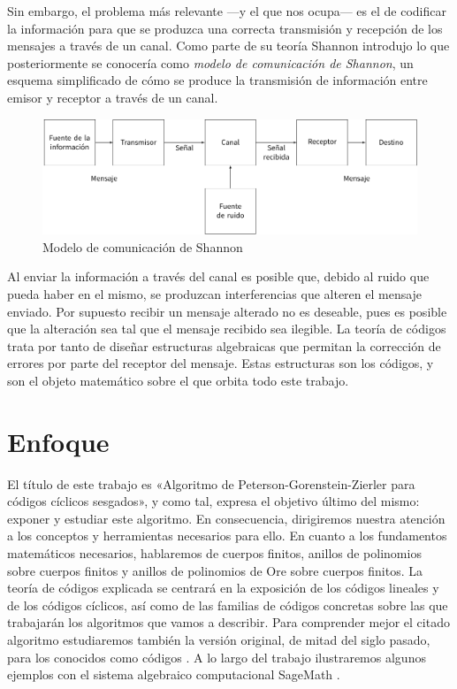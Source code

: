 Sin embargo, el problema más relevante —y el que nos ocupa— es el de codificar la información para que se produzca una correcta transmisión y recepción de los mensajes a través de un canal.
Como parte de su teoría Shannon introdujo lo que posteriormente se conocería como \emph{modelo de comunicación de Shannon}, un esquema simplificado de cómo se produce la transmisión de información entre emisor y receptor a través de un canal.
\begin{figure}
  \includegraphics[width=\textwidth]{assets/shannon-communication-model.pdf}
  \caption*{Modelo de comunicación de Shannon}
\end{figure}
Al enviar la información a través del canal es posible que, debido al ruido que pueda haber en el mismo, se produzcan interferencias que alteren el mensaje enviado.
Por supuesto recibir un mensaje alterado no es deseable, pues es posible que la alteración sea tal que el mensaje recibido sea ilegible.
La teoría de códigos trata por tanto de diseñar estructuras algebraicas que permitan la corrección de errores por parte del receptor del mensaje.
Estas estructuras son los códigos, y son el objeto matemático sobre el que orbita todo este trabajo.

\section*{Enfoque}

El título de este trabajo es «Algoritmo de Peterson-Gorenstein-Zierler para códigos cíclicos sesgados», y como tal, expresa el objetivo último del mismo: exponer y estudiar este algoritmo.
En consecuencia, dirigiremos nuestra atención a los conceptos y herramientas necesarios para ello.
En cuanto a los fundamentos matemáticos necesarios, hablaremos de cuerpos finitos, anillos de polinomios sobre cuerpos finitos y anillos de polinomios de Ore sobre cuerpos finitos.
La teoría de códigos explicada se centrará en la exposición de los códigos lineales y de los códigos cíclicos, así como de las familias de códigos concretas sobre las que trabajarán los algoritmos que vamos a describir.
Para comprender mejor el citado algoritmo estudiaremos también la versión original, de mitad del siglo pasado, para los conocidos como códigos .
A lo largo del trabajo ilustraremos algunos ejemplos con el sistema algebraico computacional SageMath \parencite{the_sage_developers_sagemath_2020}.

